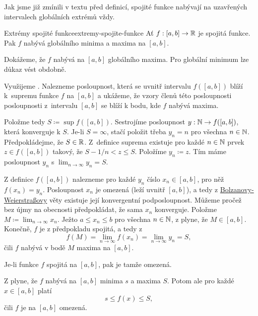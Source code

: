 Jak jsme již zmínili v textu před definicí, spojité funkce nabývají na
uzavřených intervalech globálních extrémů vždy.

\begin{theorem}{Extrémy spojité funkce}{extremy-spojite-funkce}
 Ať $f:[a,b] \to \mathbb{R}$ je spojitá funkce. Pak $f$ nabývá globálního minima a
 maxima na $[a,b]$.
\end{theorem}
\begin{thmproof}
 Dokážeme, že $f$ nabývá na $[a,b]$ globálního maxima. Pro globální minimum lze
 důkaz vést obdobně.

 Využijeme . Nalezneme
 posloupnost, která se uvnitř intervalu $f([a,b])$ blíží k~supremu funkce $f$ na
 $[a,b]$ a ukážeme, že vzory členů této posloupnosti posloupnosti z~intervalu
 $[a,b]$ se blíží k bodu, kde $f$ nabývá maxima.

 Položme tedy $S \coloneqq \sup f([a,b])$. Sestrojíme posloupnost $y: \mathbb{N} \to
 f([a,b])$, která konverguje k $S$. Je-li $S=\infty$, stačí položit třeba $y_n =
 n$ pro všechna $n \in \mathbb{N}$. Předpokládejme, že $S \in \mathbb{R}$. Z~definice suprema
 existuje pro každé $n \in \mathbb{N}$ prvek $z \in f([a,b])$ takový, že $S-1 / n < z
 \leq S$. Položíme $y_n \coloneqq z$. Tím máme posloupnost $y_n$ s $\lim_{n \to
 \infty} y_n = S$.

 Z definice $f([a,b])$ nalezneme pro každé $y_n$ číslo $x_n \in [a,b]$, pro něž
 $f(x_n) = y_n$. Posloupnost $x_n$ je omezená (leží uvnitř $[a,b]$), a tedy z
 \hyperref[thm:bolzano-weierstrass]{Bolzanovy-Weierstraßovy} věty existuje její
 konvergentní podposloupnost. Můžeme pročež bez újmy na obecnosti předpokládat,
 že sama $x_n$ konverguje. Položme $M \coloneqq \lim_{n \to \infty} x_n$. Ježto
 $a \leq x_n \leq b$ pro všechna $n \in \mathbb{N}$, z
  plyne, že $M \in [a,b]$. Konečně, $f$
 je z předpokladu spojitá, a tedy z
 \[
  f(M) = \lim_{n \to \infty} f(x_n) = \lim_{n \to \infty} y_n = S,
 \]
 čili $f$ nabývá v bodě $M$ maxima na $[a,b]$.
\end{thmproof}

\begin{corollary}{}{}
 Je-li funkce $f$ spojitá na $[a,b]$, pak je tamže omezená.
\end{corollary}
\begin{corproof}
 Z  plyne, že $f$ nabývá na $[a,b]$
 minima $s$ a maxima $S$. Potom ale pro každé $x \in [a,b]$ platí
 \[
  s \leq f(x) \leq S,
 \]
 čili $f$ je na $[a,b]$ omezená.
\end{corproof}
